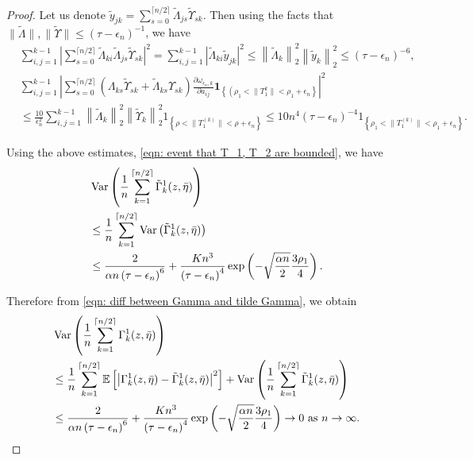 \documentclass[10pt,a4paper]{amsart}
\newcommand{\Var}{\operatorname{Var}}
\begin{document}
\begin{proof}
Let us denote $\tilde{y}_{j k}=\sum_{s=0} ^{\lceil n/2 \rceil} \tilde{\Lambda}_{j s} \tilde{\Upsilon}_{s k}$. Then using the facts that $\|\tilde{\Lambda}\|,\|\tilde{\Upsilon}\| \leq\left(\tau-\epsilon_n\right)^{-1}$, we have
\begin{align*}
    &\sum_{i,j=1}^{k-1} \left|\sum_{s=0} ^{\lceil n/2 \rceil} \tilde{\Lambda}_{k i} \tilde{\Lambda}_{j s} \tilde{\Upsilon}_{s k}\right|^2=\sum_{i,j=1}^{k-1} \left|\tilde{\Lambda}_{k i} \tilde{y}_{j k}\right|^2 \leq\left\|\tilde{\Lambda}_k\right\|_2^2\left\|\tilde{y}_k\right\|_2^2 \leq\left(\tau-\epsilon_n\right)^{-6}, \\
    &\sum_{i,j=1}^{k-1} \left|\sum_{s=0} ^{\lceil n/2 \rceil}\left(\Lambda_{ks} \tilde{\Upsilon}_{s k}+\tilde{\Lambda}_{ks} \Upsilon_{s k}\right) \frac{\partial \omega_{\epsilon_n, k}}{\partial a_{i j}} \mathbf{1}_{\left\{\left(\rho_1<\|T_1^k\|<\rho_1+\epsilon_n\right\}\right.}\right|^2 \\
  &\leq \frac{10}{\epsilon_n^2} \sum_{i,j=1}^{k-1} \left\|\tilde{\Lambda}_k\right\|_2^2\left\|\tilde{\Upsilon}_k\right\|_2^2 1_{\left\{\rho<\|T_{1}^{(k)}\|<\rho+\epsilon_n\right\}} \leq 10 n^4\left(\tau-\epsilon_n\right)^{-4} 1_{\left\{\rho_1<\|T_{1}^{(k)}\|<\rho_1+\epsilon_n\right\}} .
\end{align*}

Using the above estimates, \eqref{eqn: event that T_1, T_2 are bounded}, we have
\begin{align}
    &\Var\left(\frac{1}{n} \sum_{k=1}^{\lceil n/2 \rceil} \tilde{\Gamma}_{k}^1(z, \bar{\eta})\right) \notag\\
    &\leq \frac{1}{n} \sum_{k=1}^{\lceil n/2 \rceil} \Var\left(\tilde{\Gamma}_{k}^1(z, \bar{\eta})\right)\notag\\
    &\leq \frac{2}{\alpha n\left(\tau-\epsilon_n\right)^6}+\frac{K n^3}{\left(\tau-\epsilon_n\right)^4} \exp \left(-\sqrt{\frac{\alpha n}{2} }\frac{3 \rho_{1}}{4}\right).\notag
\end{align}

Therefore from \eqref{eqn: diff between Gamma and tilde Gamma}, we obtain
\begin{align}
    &  \Var\left(\frac{1}{n} \sum_{k=1}^{\lceil n/2 \rceil} \Gamma_{k}^1(z, \bar{\eta})\right) \notag\\
    &\leq \frac{1}{n} \sum_{k=1}^{\lceil n/2 \rceil} \mathbb{E}\left[\left|\Gamma_{k}^1(z, \bar{\eta})-\tilde{\Gamma}_{k}^1(z, \bar{\eta})\right|^2\right]+\Var\left(\frac{1}{n} \sum_{k=1}^{\lceil n/2 \rceil} \tilde{\Gamma}_{k}^1(z, \bar{\eta})\right) \notag\\
    &\leq \frac{2}{\alpha n\left(\tau-\epsilon_n\right)^6}+\frac{K n^3}{\left(\tau-\epsilon_n\right)^4} \exp \left(-\sqrt{\frac{\alpha n}{2} }\frac{3 \rho_{1}}{4}\right) \rightarrow 0 \text{ as } n\rightarrow \infty.\notag
\end{align}


\end{proof}
\end{document}
